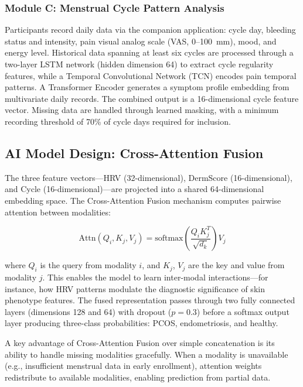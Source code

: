 \documentclass[conference]{IEEEtran}
\begin{document}
\subsubsection{Module C: Menstrual Cycle Pattern Analysis}
Participants record daily data via the companion application: cycle day, bleeding status and intensity, pain visual analog scale (VAS, 0--100~mm), mood, and energy level. Historical data spanning at least six cycles are processed through a two-layer LSTM network (hidden dimension 64) to extract cycle regularity features, while a Temporal Convolutional Network (TCN) encodes pain temporal patterns. A Transformer Encoder generates a symptom profile embedding from multivariate daily records. The combined output is a 16-dimensional cycle feature vector. Missing data are handled through learned masking, with a minimum recording threshold of 70\% of cycle days required for inclusion.

\subsection{AI Model Design: Cross-Attention Fusion}

The three feature vectors---HRV (32-dimensional), DermScore (16-dimensional), and Cycle (16-dimensional)---are projected into a shared 64-dimensional embedding space. The Cross-Attention Fusion mechanism computes pairwise attention between modalities:

\begin{equation}
\text{Attn}(Q_i, K_j, V_j) = \text{softmax}\left(\frac{Q_i K_j^T}{\sqrt{d_k}}\right) V_j
\end{equation}

\noindent where $Q_i$ is the query from modality $i$, and $K_j$, $V_j$ are the key and value from modality $j$. This enables the model to learn inter-modal interactions---for instance, how HRV patterns modulate the diagnostic significance of skin phenotype features. The fused representation passes through two fully connected layers (dimensions 128 and 64) with dropout ($p = 0.3$) before a softmax output layer producing three-class probabilities: PCOS, endometriosis, and healthy.

A key advantage of Cross-Attention Fusion over simple concatenation is its ability to handle missing modalities gracefully. When a modality is unavailable (e.g., insufficient menstrual data in early enrollment), attention weights redistribute to available modalities, enabling prediction from partial data.
\end{document}
